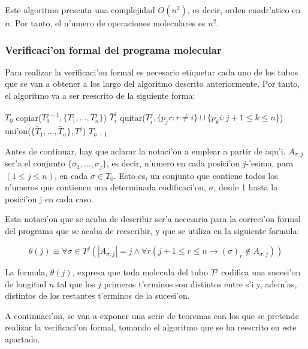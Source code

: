 \documentclass[12pt]{article}
\begin{document}
Este algoritmo presenta una complejidad $O(n^2)$, es decir, orden cuadr'atico en $n$. Por tanto, el n'umero de
operaciones moleculares es $n^2$.

\subsubsection{Verificaci'on formal del programa molecular}

Para realizar la verificaci'on formal es necesario etiquetar cada uno de los tubos que se van a obtener
a los largo del algoritmo descrito anteriormente. Por tanto, el algoritmo va a ser reescrito de la
siguiente forma:

\begin{algorithmic}
    \Require $T_{0}$
        \State copiar($T^{j-1}_{0}, \{T^{j}_{1},...,T^{j}_{n}\}$)
            \State $\bar{T}^{j}_{i}$ \leftarrow quitar($T^{j}_{i}, \{p_{j}r : r \neq i\} \cup \{p_{k}i : j + 1 \leq k \leq n\} $)
        \EndFor
        \State uni'on($\{\bar{T}_{1},...,\bar{T}_{n}\},T^{j}$)
    \EndFor
    \Return $T_{n - 1}$
\end{algorithmic}

Antes de continuar, hay que aclarar la notaci'on a emplear a partir de aqu'i. $A_{\sigma,j}$ ser'a el conjunto
$\{\sigma_{1},...,\sigma_{j}\}$, es decir, n'umero en cada posici'on $j$-'esima, para $(1 \leq j \leq n)$, en cada
$\sigma \in T_{0}$. Esto es, un conjunto que contiene todos los n'umeros que contienen una determinada codificaci'on, $\sigma$,
desde 1 hasta la posici'on j en cada caso.

Esta notaci'on que se acaba de describir ser'a necesaria para la correci'on formal del programa que se
acaba de reescribir, y que se utiliza en la siguiente formula:

\begin{equation*}
  \theta(j) \equiv \forall \sigma \in T^{j} (|A_{\sigma,j}| = j \land \forall r ( j + 1 \leq r \leq n \rightarrow
  (\sigma)_{r} \notin A_{\sigma,j} ))
\end{equation*}

La formula, $\theta(j)$, expresa que toda molecula del tubo $T^{j}$ codifica una sucesi'on de longitud $n$ tal que
los $j$ primeros t'erminos son distintos entre s'i y, adem'as, distintos de los restantes t'erminos de la sucesi'on.

A continuaci'on, se van a exponer una serie de teoremas con los que se pretende realizar la verificaci'on formal,
tomando el algoritmo que se ha reescrito en este apartado.
\end{document}
